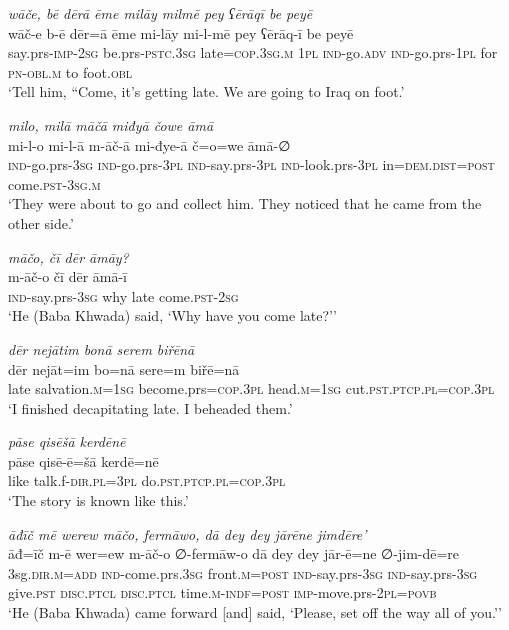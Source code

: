 \ea \label{BP.78}
\textit{wāče, bē dērā ēme milāy milmē pey ʕērāqī be peyē} \\ 
\gll wāč-e b-ē dēr=ā ēme mi-lāy mi-l-mē pey ʕērāq-ī be peyē \\ 
 say.prs-\textsc{imp-}\textsc{2sg} be.prs\textsc{-pstc}\textsc{.3sg} late\textsc{=cop}\textsc{.3sg}\textsc{.m} \textsc{1pl} \textsc{ind-}go\textsc{.adv} \textsc{ind-}go.prs\textsc{-\textsc{1pl}} for \textsc{pn}\textsc{-obl}\textsc{.m} to foot\textsc{.obl} \\ 
\glt `Tell him, “Come, it’s getting late. We are going to Iraq on foot.'
\z 
 
\ea \label{BP.80}
\textit{milo, milā māčā miđyā čowe āmā} \\ 
\gll mi-l-o mi-l-ā m-āč-ā mi-đye-ā č=o=we āmā-∅ \\ 
 \textsc{ind-}go.prs\textsc{-3sg} \textsc{ind-}go.prs\textsc{-3pl} \textsc{ind-}say.prs\textsc{-3pl} \textsc{ind-}look.prs\textsc{-3pl} in=\textsc{dem.dist}\textsc{=\textsc{post}} come\textsc{.pst}\textsc{-3sg}\textsc{.m} \\ 
\glt `They were about to go and collect him. They noticed that he came from the other side.'
\z 
 
\ea \label{BP.81}
\textit{māčo, čī dēr āmāy?} \\ 
\gll m-āč-o čī dēr āmā-ī \\ 
 \textsc{ind-}say.prs\textsc{-3sg} why late come\textsc{.pst}-\textsc{2sg} \\ 
\glt `He (Baba Khwada) said, ‘Why have you come late?’'
\z 
 
\ea \label{BP.83}
\textit{dēr nejātim bonā serem biřēnā} \\ 
\gll dēr nejāt=im bo=nā sere=m biřē=nā \\ 
 late salvation\textsc{.m}\textsc{=\textsc{1sg}} become.prs\textsc{=cop}\textsc{.3pl} head\textsc{.m}\textsc{=\textsc{1sg}} cut\textsc{.pst}\textsc{.ptcp}\textsc{.pl}\textsc{=cop}\textsc{.3pl} \\ 
\glt `I finished decapitating late. I beheaded them.'
\z 
 
\ea \label{BP.85}
\textit{pāse qisēšā kerdēnē} \\ 
\gll pāse qisē-ē=šā kerdē=nē \\ 
 like talk.f\textsc{-dir}\textsc{.pl}\textsc{=3pl} do\textsc{.pst}\textsc{.ptcp}\textsc{.pl}\textsc{=cop}\textsc{.3pl} \\ 
\glt `The story is known like this.'
\z 
 
\ea \label{BP.86}
\textit{āđīč mē werew māčo, fermāwo, dā dey dey jārēne jimdēre’} \\ 
\gll āđ=īč m-ē wer=ew m-āč-o ∅-fermāw-o dā dey dey jār-ē=ne ∅-jim-dē=re \\ 
 3sg\textsc{.dir}\textsc{.m}\textsc{=add} \textsc{ind-}come.prs\textsc{.3sg} front\textsc{.m}\textsc{=\textsc{post}} \textsc{ind-}say.prs\textsc{-3sg} \textsc{ind-}say.prs\textsc{-3sg} give\textsc{.pst} \textsc{disc.ptcl} \textsc{disc.ptcl} time\textsc{.m}\textsc{-indf}\textsc{=\textsc{post}} \textsc{imp-}move.prs-\textsc{2pl}\textsc{=\textsc{povb}} \\ 
\glt `He (Baba Khwada) came forward [and] said, ‘Please, set off the way all of you.’'
\z 
 
